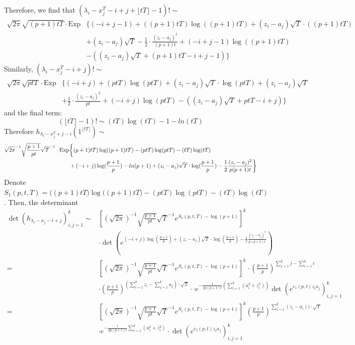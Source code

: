 \documentclass[12pt]{article}
\begin{document}
Therefore, we find that $(\lambda_{i}-x_{j}^{T}-i+j+\lfloor tT \rfloor -1)!\sim$
\begin{align*}
	\sqrt{2\pi}\sqrt{(p+1)tT}\cdot \text{Exp}&\{(-i+j-1) + ((p+1)tT)\log((p+1)tT)+(z_{i}-a_{j})\sqrt{T}\cdot ((p+1)tT)\\
	&+(z_{i}-a_{j})\sqrt{T}-\frac{1}{2}\cdot\frac{(z_{i}-a_{j})^2}{(p+1)t}+(-i+j-1)\log((p+1)tT)\\&-\left((z_{i}-a_{j})\sqrt{T} + (p+1)tT-i+j-1\right)\}
\end{align*}
Similarly, $(\lambda_{i}-x_{j}^{T}-i+j)!\sim$
\begin{align*}
\sqrt{2\pi}\sqrt{ptT}\cdot \text{Exp}&\{(-i+j) + (ptT)\log(ptT)+(z_{i}-a_{j})\sqrt{T}\cdot \log(ptT)+(z_{i}-a_{j})\sqrt{T}\\
& +\frac{1}{2}\cdot\frac{(z_{i}-a_{j})^2}{pt}+(-i+j)\log(ptT)-((z_{i}-a_{j})\sqrt{T} + ptT-i+j)\}
\end{align*} and the final term: $$
(\lfloor tT \rfloor-1)!\sim (tT)\log(tT)-1-ln(tT)$$
Therefore $h_{\lambda_{i}-x^{T}_{j}+j-i}(1^{\lfloor tT \rfloor})\sim$
\begin{align*}
	\sqrt{2\pi}^{-1}\sqrt{\frac{p+1}{pt}}\sqrt{T}^{-1}\cdot \text{Exp}&\bigg\{\vphantom((p+1)tT)\log((p+1)tT)-(ptT)\log(ptT)-(tT)\log(tT)\\
	& +(-i+j)\log(\frac{p+1}{p})-ln(p+1)+(z_{i}-a_{j})\sqrt{T}\cdot \log(\frac{p+1}{p})-\frac{1}{2}\frac{(z_{i}-a_{j})^{2}}{p(p+1)t}\bigg\}
\end{align*}
Denote $S_{1}(p,t,T)=\big((p+1)tT)\log((p+1)tT\big)-(ptT)\log(ptT)-(tT)\log(tT)$. Then, the determinant 
\begin{align*} 
\det(h_{\lambda_{i}-x_{j}-i+j})_{i,j=1}^{k} \sim&\left[(\sqrt{2\pi})^{-1}\sqrt{\frac{p+1}{pt}}\sqrt{T}^{-1}e^{S_{1}(p,t,T)-\log(p+1)}\right]^{k}\\
&\cdot
	 \det\left(e^{(-i+j)\log(\frac{p+1}{p})+(z_{i}-a_{j})\sqrt{T}\cdot \log(\frac{p+1}{p})-\frac{1}{2}\frac{(z_{i}-a_{j})^2}{p(p+1)t}}\right)\\
	=&\left[(\sqrt{2\pi})^{-1}\sqrt{\frac{p+1}{pt}}\sqrt{T}^{-1}e^{S_{1}(p,t,T)-\log(p+1)}\right]^{k}\cdot \left(\frac{p+1}{p}\right)^{\sum_{j=1}^k j-\sum_{i=1}^{k}i} \\
	 &\cdot\left(\frac{p+1}{p}\right)^{\left(\sum_{i=1}^{k}z_{i}-\sum_{j=1}^{k}a_{j}\right)\cdot\sqrt{T}}\cdot \cdot e^{-\frac{1}{2p(p+1)t}(\sum_{i=1}^{k}(a_{i}^2+z_{i}^2))}\det(e^{c_{1}(p,t)z_{i}a_{j}})_{i,j=1}^{k}\\
	 =& \left[(\sqrt{2\pi})^{-1}\sqrt{\frac{p+1}{pt}}\sqrt{T}^{-1}e^{S_{1}(p,t,T)-\log(p+1)}\right]^{k}\left(\frac{p+1}{p}\right)^{\sum_{i=1}^{k}(z_{i}-a_{i}))\cdot\sqrt{T}} \\
	&\cdot e^{-\frac{1}{2p(p+1)t}\sum_{i=1}^{k}(a_{i}^2+z_{i}^2)}\cdot \det\left(e^{c_{1}(p,t)z_{i}a_{j}}\right)_{i,j=1}^{k}
\end{align*}
\end{document}
